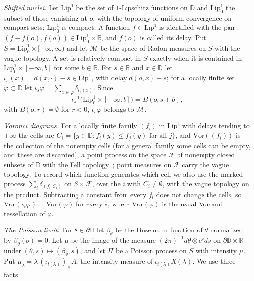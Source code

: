 \documentclass[11pt]{amsart}
\theoremstyle{definition}
\theoremstyle{remark}
\newcommand{\D}{\mathbb{D}}
\newcommand{\R}{\mathbb{R}}
\newcommand{\M}{\mathcal{M}}
\newcommand{\Lip}{\mathrm{Lip}}
\newcommand{\Vor}{\mathrm{Vor}}
\newcommand{\area}{A}
\begin{document}
\emph{Shifted nuclei.} Let $\Lip^1$ be the set of $1$-Lipschitz functions on $\D$ and $\Lip^1_0$ the subset of those
vanishing at $o$, with the topology of uniform convergence on compact sets; $\Lip^1_0$ is compact. A function
$f\in\Lip^1$ is identified with the pair $(f-f(o),f(o))\in\Lip^1_0\times\R$, and $f(o)$ is called its delay. Put
$S=\Lip^1_0\times[-\infty,\infty)$ and let $\M$ be the space of Radon measures on $S$ with the vague topology. A set is
relatively compact in $S$ exactly when it is contained in $\Lip^1_0\times[-\infty,b]$ for some $b\in\R$. For $s\in\R$
and $x\in\D$ let $\iota_s(x)=d(x,\cdot)-s\in\Lip^1$, with delay $d(o,x)-s$; for a locally finite set $\varphi\subset\D$
let $\iota_s\varphi=\sum_{x\in\varphi}\delta_{\iota_s(x)}$. Since
\begin{equation}\label{eq:preimage}
  \iota_s^{-1}\bigl(\Lip^1_0\times[-\infty,b]\bigr)=B(o,s+b),
\end{equation}
with $B(o,r)=\emptyset$ for $r<0$, $\iota_s\varphi$ belongs to $\M$.

\emph{Voronoi diagrams.} For a locally finite family $(f_i)$ in $\Lip^1$ with delays tending to $+\infty$ the cells are
$C_i=\{y\in\D: f_i(y)\le f_j(y)\text{ for all }j\}$, and $\Vor((f_i))$ is the collection of the nonempty cells (for a
general family some cells can be empty, and these are discarded), a point process on the space $\mathcal F$ of
nonempty closed subsets of $\D$ with the Fell topology~\cite[Section~2.2]{DK26}; point measures on $\mathcal F$ carry
the vague topology. To record which function generates which cell we also use the marked process
$\sum_i\delta_{(f_i,C_i)}$ on $S\times\mathcal F$, over the $i$ with $C_i\ne\emptyset$, with the vague topology on the
product. Subtracting a constant from every $f_i$ does not change the cells, so $\Vor(\iota_s\varphi)=
\Vor(\varphi)$ for every $s$, where $\Vor(\varphi)$ is the usual Voronoi tessellation of $\varphi$.

\emph{The Poisson limit.} For $\theta\in\partial\D$ let $\beta_\theta$ be the Busemann function of $\theta$ normalized by
$\beta_\theta(o)=0$. Let $\mu$ be the image of the measure $(2\pi)^{-1}d\theta\otimes e^{s}ds$ on $\partial\D\times\R$
under $(\theta,s)\mapsto(\beta_\theta,s)$, and let $\Pi$ be a Poisson process on $S$ with intensity $\mu$. Put
$\mu_\lambda=\lambda\,(\iota_{t(\lambda)})_\#\area$, the intensity measure of $\iota_{t(\lambda)}X(\lambda)$. We use three
facts.
\end{document}

